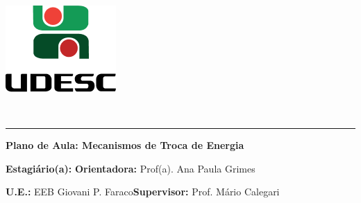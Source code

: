 \documentclass[
12pt,				%
openright,			%
oneside,			%
a4paper,			%
chapter=TITLE,		%
english,			%
brazil				%
]{abntex2}
\begin{document}
\thispagestyle{empty}
\begin{center}
	\begin{minipage}[!]{\linewidth}
		\begin{minipage}[!]{.19\linewidth}
			\includegraphics[width=\linewidth]{img/logo.png}           
		\end{minipage}
		\begin{minipage}[!]{.8\linewidth}
			\center
			\ABNTEXchapterfont\normalsize\MakeUppercase{\imprimirinstituicao}
			\par
			\vspace*{10pt}                     
			\ABNTEXchapterfont\normalsize\MakeUppercase{\centro}
			\par
			\vspace*{10pt}           
			\ABNTEXchapterfont\normalsize\MakeUppercase{\disciplina}
		\end{minipage}        
	\end{minipage}
	\\ \vspace{0.5cm}
	\rule{\textwidth}{.5pt}   
\end{center}
\textual
\begin{center}
	\textbf{Plano de Aula: Mecanismos de Troca de Energia}
\end{center}
\par\noindent\textbf{Estagiário(a):} \imprimirautor\hfill{}\textbf{Orientadora:} Prof(a). Ana Paula Grimes
\par\noindent\textbf{U.E.:} EEB Giovani P. Faraco\hfill{}\textbf{Supervisor:} Prof. Mário Calegari
\end{document}
